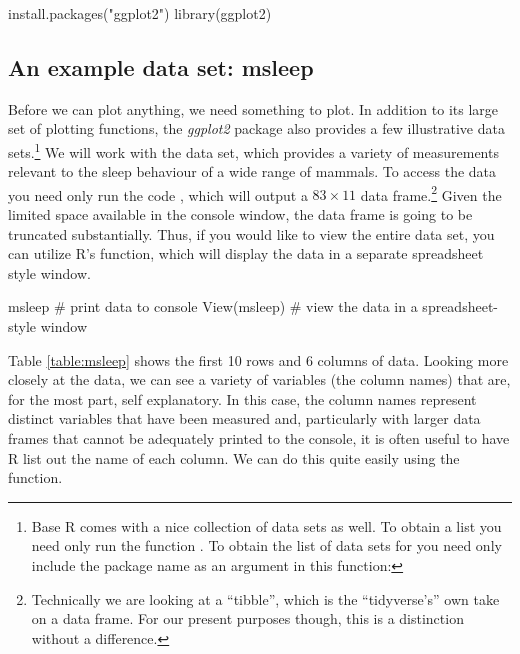 \begin{inR}
install.packages("ggplot2")
library(ggplot2)
\end{inR}

\subsection{An example data set: msleep}

Before we can plot anything, we need something to plot.  In addition to its large set of plotting functions, the \textit{ggplot2} package also provides a few illustrative data sets.\footnote{Base R comes with a nice collection of data sets as well. To obtain a list you need only run the function .  To obtain the list of data sets for  you need only include the package name as an argument in this function: } We will work with the  data set, which provides a variety of measurements relevant to the sleep behaviour of a wide range of mammals. To access the data you need only run the code , which will output a $83 \times 11$ data frame.\footnote{Technically we are looking at a ``tibble'', which is the ``tidyverse's'' own take on a data frame. For our present purposes though, this is a distinction without a difference.} Given the limited space available in the console window, the data frame is going to be truncated substantially. Thus, if you would like to view the entire data set, you can utilize R's  function, which will display the data in a separate spreadsheet style window.

\begin{inR}
msleep # print data to console
View(msleep) # view the data in a spreadsheet-style window
\end{inR}

\vspace{2em}



\noindent
Table \ref{table:msleep} shows the first 10 rows and 6 columns of  data.  Looking more closely at the data, we can see a variety of variables (the column names) that are, for the most part, self explanatory.
In this case, the column names represent distinct variables that have been measured and, particularly with larger data frames that cannot be adequately printed to the console, it is often useful to have R list out the name of each column. We can do this quite easily using the  function.

